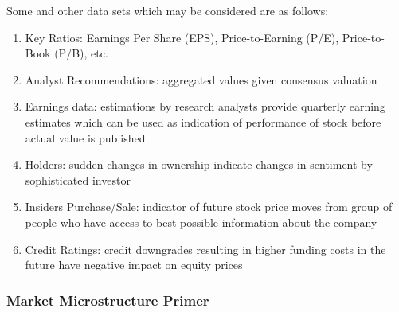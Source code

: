 Some  and other data sets which may be considered are as follows:
\begin{enumerate}[label=\roman*.]
\setlength{\itemsep}{0pt}
\item Key Ratios: Earnings Per Share (EPS), Price-to-Earning (P/E), Price-to-Book (P/B), etc. 
\item Analyst Recommendations: aggregated values given consensus valuation
\item Earnings data: estimations by research analysts provide quarterly earning estimates which can be used as indication of performance of stock before actual value is published
\item Holders: sudden changes in ownership indicate changes in sentiment by sophisticated investor
\item Insiders Purchase/Sale: indicator of future stock price moves from group of people who have access to best possible information about the company
\item Credit Ratings: credit downgrades resulting in higher funding costs in the future have negative impact on equity prices
\end{enumerate}

\subsubsection{Market Microstructure Primer}



